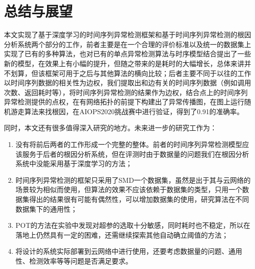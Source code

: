 
\chapter{总结与展望}
\label{cha:intro}
本文实现了基于深度学习的时间序列异常检测框架和基于时间序列异常检测的根因分析系统两个部分的工作，前者主要是在一个合理的评价标准以及统一的数据集上实现了已有的多种算法，也对已有的单点异常检测算法与时序模型结合提出了一些新的模型，在效果上有小幅的提升，但随之带来的是耗时的大幅增长，总体来讲并不划算，但该框架可用于之后与其他算法的横向比较；后者主要不同于以往的工作以时间序列数据的相关性为边权，我们提取出和边有关的时间序列数据（例如调用次数、返回耗时等），将时间序列异常检测的结果作为边权，结合点上的时间序列异常检测提供的点权，在有网络拓扑的前提下构建出了异常传播图，在图上运行随机游走算法来找根因，在AIOPS2020挑战赛中进行验证，得到了0.91的准确率。

同时，本文还有很多值得深入研究的地方。未来进一步的研究工作为：
\begin{enumerate}
    \item 没有将前后两者的工作形成一个完整的整体。前者的时间序列异常检测模型应该服务于后者的根因分析系统，但在评测时由于数据量的问题我们在根因分析系统中没能采用基于深度学习的方法；
    \item 时间序列异常检测的框架只采用了SMD一个数据集，虽然是出于其与云网络的场景较为相似而使用，但算法的效果不应该依赖于数据集的类型，只用一个数据集得出的结果很有可能有偶然性，可以增加数据集的使用，研究算法在不同数据集下的通用性；
    \item POT的方法在实验中发现对超参的选取十分敏感，同时耗时也不稳定，所以在落地上仍然具有一定的困难，还需继续探索其他自动确立阈值的方法；
    \item 将设计的系统实际部署到云网络中进行使用，还要考虑数据量的问题、通用性、检测效率等等问题是否满足要求。
\end{enumerate}

